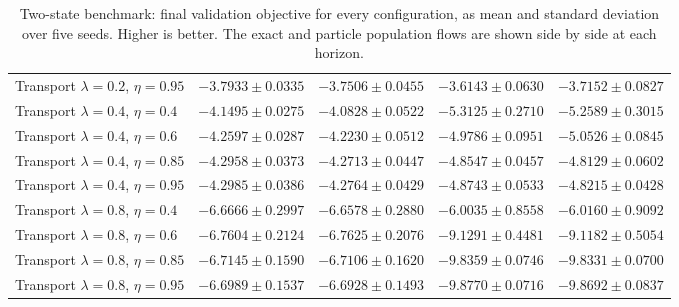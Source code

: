 \begin{table}[H]
\begin{tabular}{lrrrr}
Transport $\lambda=0.2$, $\eta=0.95$ & $-3.7933\pm0.0335$ & $-3.7506\pm0.0455$ & $-3.6143\pm0.0630$ & $-3.7152\pm0.0827$ \\
Transport $\lambda=0.4$, $\eta=0.4$ & $-4.1495\pm0.0275$ & $-4.0828\pm0.0522$ & $-5.3125\pm0.2710$ & $-5.2589\pm0.3015$ \\
Transport $\lambda=0.4$, $\eta=0.6$ & $-4.2597\pm0.0287$ & $-4.2230\pm0.0512$ & $-4.9786\pm0.0951$ & $-5.0526\pm0.0845$ \\
Transport $\lambda=0.4$, $\eta=0.85$ & $-4.2958\pm0.0373$ & $-4.2713\pm0.0447$ & $-4.8547\pm0.0457$ & $-4.8129\pm0.0602$ \\
Transport $\lambda=0.4$, $\eta=0.95$ & $-4.2985\pm0.0386$ & $-4.2764\pm0.0429$ & $-4.8743\pm0.0533$ & $-4.8215\pm0.0428$ \\
Transport $\lambda=0.8$, $\eta=0.4$ & $-6.6666\pm0.2997$ & $-6.6578\pm0.2880$ & $-6.0035\pm0.8558$ & $-6.0160\pm0.9092$ \\
Transport $\lambda=0.8$, $\eta=0.6$ & $-6.7604\pm0.2124$ & $-6.7625\pm0.2076$ & $-9.1291\pm0.4481$ & $-9.1182\pm0.5054$ \\
Transport $\lambda=0.8$, $\eta=0.85$ & $-6.7145\pm0.1590$ & $-6.7106\pm0.1620$ & $-9.8359\pm0.0746$ & $-9.8331\pm0.0700$ \\
Transport $\lambda=0.8$, $\eta=0.95$ & $-6.6989\pm0.1537$ & $-6.6928\pm0.1493$ & $-9.8770\pm0.0716$ & $-9.8692\pm0.0837$ \\
\bottomrule
\end{tabular}
\caption{Two-state benchmark: final validation objective for every configuration, as mean and standard deviation over five seeds. Higher is better. The exact and particle population flows are shown side by side at each horizon.}
\label{tab:full-objectives-twostate}
\end{table}
